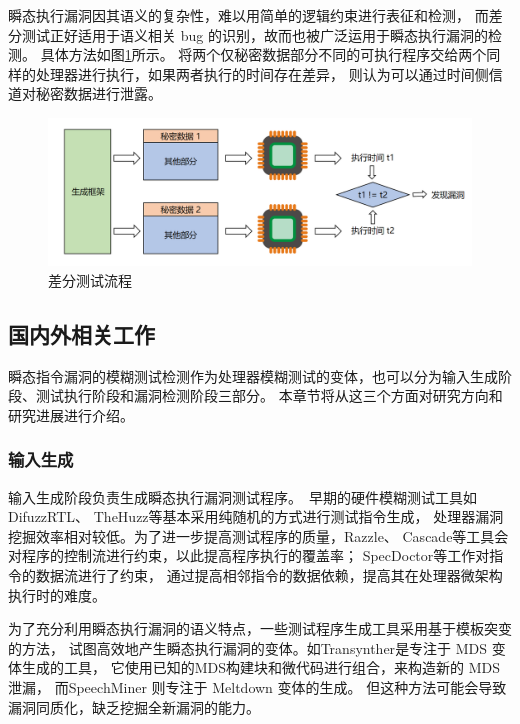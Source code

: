 瞬态执行漏洞因其语义的复杂性，难以用简单的逻辑约束进行表征和检测，
而差分测试正好适用于语义相关 bug 的识别，故而也被广泛运用于瞬态执行漏洞的检测。
具体方法如图\ref{paper:differential-test}所示。
将两个仅秘密数据部分不同的可执行程序交给两个同样的处理器进行执行，如果两者执行的时间存在差异，
则认为可以通过时间侧信道对秘密数据进行泄露。\par

\begin{figure}[!h]
    \centering
    \includegraphics[width=\linewidth]{figure/paper/differential-test.png}
    \caption{差分测试流程}
    \label{paper:differential-test}
\end{figure}

\subsection{国内外相关工作}

瞬态指令漏洞的模糊测试检测作为处理器模糊测试的变体，也可以分为输入生成阶段、测试执行阶段和漏洞检测阶段三部分。
本章节将从这三个方面对研究方向和研究进展进行介绍。

\subsubsection{输入生成}
输入生成阶段负责生成瞬态执行漏洞测试程序。\
早期的硬件模糊测试工具如 DifuzzRTL\cite{hur2021difuzzrtl}、
TheHuzz\cite{kande2022thehuzz}等基本采用纯随机的方式进行测试指令生成，
处理器漏洞挖掘效率相对较低。为了进一步提高测试程序的质量，Razzle\cite{razzle}、
Cascade\cite{soltcascade}等工具会对程序的控制流进行约束，以此提高程序执行的覆盖率；
SpecDoctor\cite{hur2022specdoctor}等工作对指令的数据流进行了约束，
通过提高相邻指令的数据依赖，提高其在处理器微架构执行时的难度。\par

为了充分利用瞬态执行漏洞的语义特点，一些测试程序生成工具采用基于模板突变的方法，
试图高效地产生瞬态执行漏洞的变体。如Transynther\cite{moghimi2020medusa}是专注于 MDS 变体生成的工具，
它使用已知的MDS构建块和微代码进行组合，来构造新的 MDS 泄漏，
而SpeechMiner \cite{xiao2019speechminer}则专注于 Meltdown 变体的生成。
但这种方法可能会导致漏洞同质化，缺乏挖掘全新漏洞的能力。\par

